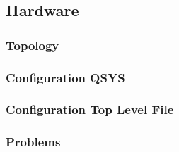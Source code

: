 \subsection{Hardware}
\subsubsection{Topology}

\subsubsection{Configuration QSYS}

\subsubsection{Configuration Top Level File}

\subsubsection{Problems}
